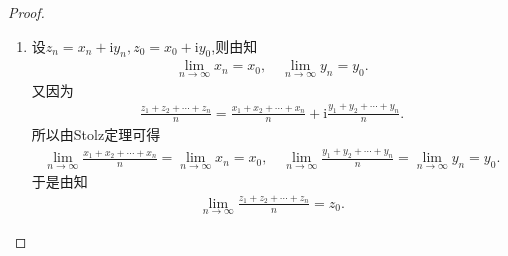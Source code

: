 \documentclass[../../main.tex]{subfiles}%
\begin{document}
\begin{proof}
\begin{enumerate}[(1)]
\item 设$z_n=x_n+\mathrm{i}y_n,z_0=x_0+\mathrm{i}y_0$,则由知
\begin{align*}
\lim\limits_{n\rightarrow \infty}x_n=x_0,\quad \lim\limits_{n\rightarrow \infty}y_n=y_0.
\end{align*}
又因为
\begin{align*}
\frac{z_1+z_2+\cdots +z_n}{n}=\frac{x_1+x_2+\cdots +x_n}{n}+\mathrm{i}\frac{y_1+y_2+\cdots +y_n}{n}.
\end{align*}
所以由Stolz定理可得
\begin{align*}
\lim\limits_{n\rightarrow \infty}\frac{x_1+x_2+\cdots +x_n}{n}=\lim\limits_{n\rightarrow \infty}x_n=x_0,\quad \lim\limits_{n\rightarrow \infty}\frac{y_1+y_2+\cdots +y_n}{n}=\lim\limits_{n\rightarrow \infty}y_n=y_0.
\end{align*}
于是由知
\begin{align*}
\lim\limits_{n\rightarrow \infty}\frac{z_1+z_2+\cdots +z_n}{n}=z_0.
\end{align*}
\end{enumerate}
\end{proof}
\end{document}
